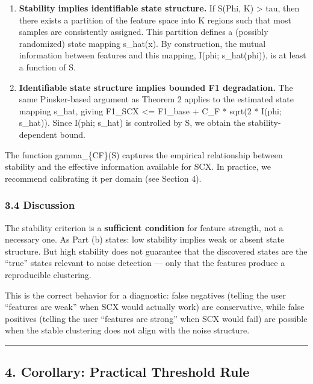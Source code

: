 \documentclass[
  12pt,
]{ctexart}
\begin{document}
\begin{enumerate}
\def\labelenumi{\arabic{enumi}.}
\item
  \textbf{Stability implies identifiable state structure.} If S(Phi, K)
  \textgreater{} tau, then there exists a partition of the feature space
  into K regions such that most samples are consistently assigned. This
  partition defines a (possibly randomized) state mapping s\_hat(x). By
  construction, the mutual information between features and this
  mapping, I(phi; s\_hat(phi)), is at least a function of S.
\item
  \textbf{Identifiable state structure implies bounded F1 degradation.}
  The same Pinsker-based argument as Theorem 2 applies to the estimated
  state mapping s\_hat, giving F1\_SCX \textless= F1\_base + C\_F *
  sqrt(2 * I(phi; s\_hat)). Since I(phi; s\_hat) is controlled by S, we
  obtain the stability-dependent bound.
\end{enumerate}

The function gamma\_\{CF\}(S) captures the empirical relationship
between stability and the effective information available for SCX. In
practice, we recommend calibrating it per domain (see Section 4).

\subsubsection{3.4 Discussion}\label{discussion}

The stability criterion is a \textbf{sufficient condition} for feature
strength, not a necessary one. As Part (b) states: low stability implies
weak or absent state structure. But high stability does not guarantee
that the discovered states are the ``true'' states relevant to noise
detection --- only that the features produce a reproducible clustering.

This is the correct behavior for a diagnostic: false negatives (telling
the user ``features are weak'' when SCX would actually work) are
conservative, while false positives (telling the user ``features are
strong'' when SCX would fail) are possible when the stable clustering
does not align with the noise structure.

\begin{center}\rule{0.5\linewidth}{0.5pt}\end{center}

\subsection{4. Corollary: Practical Threshold
Rule}\label{corollary-practical-threshold-rule}
\end{document}
